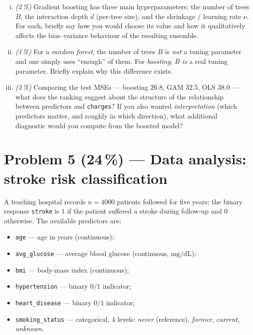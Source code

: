 \documentclass[11pt,a4paper]{article}
\newcommand{\points}[1]{\textbf{(#1\,\%)}}
\newcommand{\subpoints}[1]{\textit{(#1\,\%)}}
\begin{document}
\begin{enumerate}[(i)]
  \item \subpoints{2} Gradient boosting has three main hyperparameters: the number of trees $B$, the interaction depth $d$ (per-tree size), and the shrinkage / learning rate $\nu$. For each, briefly say how you would choose its value and how it qualitatively affects the bias--variance behaviour of the resulting ensemble.
  \item \subpoints{1} For a \emph{random forest}, the number of trees $B$ is \emph{not} a tuning parameter and one simply uses ``enough'' of them. For \emph{boosting}, $B$ \emph{is} a real tuning parameter. Briefly explain why this difference exists.
  \item \subpoints{2} Comparing the test MSEs --- boosting $26.8$, GAM $32.5$, OLS $38.0$ --- what does the ranking suggest about the structure of the relationship between predictors and \texttt{charges}? If you also wanted \emph{interpretation} (which predictors matter, and roughly in which direction), what additional diagnostic would you compute from the boosted model?
\end{enumerate}

\vfill\eject

\section*{Problem 5 \points{24} --- Data analysis: stroke risk classification}

A teaching hospital records $n = 4000$ patients followed for five years; the binary response \texttt{stroke} is $1$ if the patient suffered a stroke during follow-up and $0$ otherwise. The available predictors are:
\begin{itemize}
  \item \texttt{age} --- age in years (continuous);
  \item \texttt{avg\_glucose} --- average blood glucose (continuous, $\mathrm{mg/dL}$);
  \item \texttt{bmi} --- body-mass index (continuous);
  \item \texttt{hypertension} --- binary $0/1$ indicator;
  \item \texttt{heart\_disease} --- binary $0/1$ indicator;
  \item \texttt{smoking\_status} --- categorical, $4$ levels: \emph{never} (reference), \emph{former}, \emph{current}, \emph{unknown}.
\end{itemize}
\end{document}
